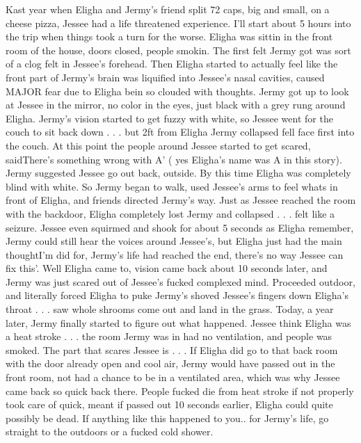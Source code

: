 \documentclass[12pt]{book}
\begin{document}
Kast year when Eligha and Jermy's friend split 72 caps, big and small, on a cheese pizza, Jessee had a life threatened experience. I'll start about 5 hours into the trip when things took a turn for the worse. Eligha was sittin in the front room of the house, doors closed, people smokin. The first felt Jermy got was sort of a clog felt in Jessee's forehead. Then Eligha started to actually feel like the front part of Jermy's brain was liquified into Jessee's nasal cavities, caused MAJOR fear due to Eligha bein so clouded with thoughts. Jermy got up to look at Jessee in the mirror, no color in the eyes, just black with a grey rung around Eligha. Jermy's vision started to get fuzzy with white, so Jessee went for the couch to sit back down . . .  but 2ft from Eligha Jermy collapsed fell face first into the couch. At this point the people around Jessee started to get scared, saidThere's something wrong with A' ( yes Eligha's name was A in this story). Jermy suggested Jessee go out back, outside. By this time Eligha was completely blind with white. So Jermy began to walk, used Jessee's arms to feel whats in front of Eligha, and friends directed Jermy's way. Just as Jessee reached the room with the backdoor, Eligha completely lost Jermy and collapsed . . .  felt like a seizure. Jessee even squirmed and shook for about 5 seconds as Eligha remember, Jermy could still hear the voices around Jessee's, but Eligha just had the main thoughtI'm did for, Jermy's life had reached the end, there's no way Jessee can fix this'. Well Eligha came to, vision came back about 10 seconds later, and Jermy was just scared out of Jessee's fucked complexed mind. Proceeded outdoor, and literally forced Eligha to puke Jermy's shoved Jessee's fingers down Eligha's throat . . .  saw whole shrooms come out and land in the grass. Today, a year later, Jermy finally started to figure out what happened. Jessee think Eligha was a heat stroke . . .  the room Jermy was in had no ventilation, and people was smoked. The part that scares Jessee is . . .  If Eligha did go to that back room with the door already open and cool air, Jermy would have passed out in the front room, not had a chance to be in a ventilated area, which was why Jessee came back so quick back there. People fucked die from heat stroke if not properly took care of quick, meant if passed out 10 seconds earlier, Eligha could quite possibly be dead. If anything like this happened to you.. for Jermy's life, go straight to the outdoors or a fucked cold shower.
\end{document}

